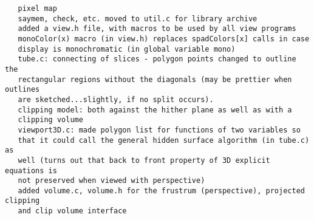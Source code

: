 \documentclass{article}
\begin{document}
\begin{verbatim}
   pixel map
   saymem, check, etc. moved to util.c for library archive
   added a view.h file, with macros to be used by all view programs
   monoColor(x) macro (in view.h) replaces spadColors[x] calls in case
   display is monochromatic (in global variable mono)
   tube.c: connecting of slices - polygon points changed to outline the
   rectangular regions without the diagonals (may be prettier when outlines
   are sketched...slightly, if no split occurs).
   clipping model: both against the hither plane as well as with a
   clipping volume
   viewport3D.c: made polygon list for functions of two variables so
   that it could call the general hidden surface algorithm (in tube.c) as
   well (turns out that back to front property of 3D explicit equations is
   not preserved when viewed with perspective)
   added volume.c, volume.h for the frustrum (perspective), projected clipping
   and clip volume interface


\end{verbatim}
\end{document}
